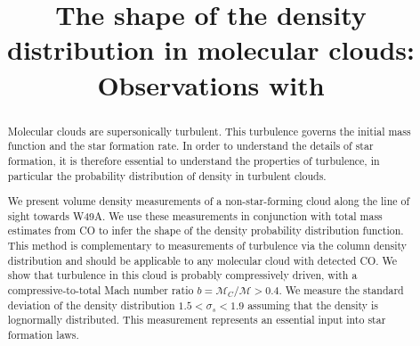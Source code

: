 \title{The shape of the density distribution in molecular clouds: Observations with
\formaldehyde}
\begin{abstract}
    Molecular clouds are supersonically turbulent.  This turbulence governs
    the initial mass function and the star formation rate.  In order to
    understand the details of star formation, it is therefore essential to understand
    the properties of turbulence, in particular the probability distribution of
    density in turbulent clouds.

    We present \formaldehyde volume density measurements of a non-star-forming
    cloud along the line of sight towards W49A. We use these measurements in
    conjunction with total mass estimates from CO to infer the shape of the
    density probability distribution function.  This method is complementary to
    measurements of turbulence via the column density distribution and should
    be applicable to any molecular cloud with detected CO.  We show that
    turbulence in this cloud is probably compressively driven, with a
    compressive-to-total Mach number ratio $b = \mathcal{M}_C/\mathcal{M}>0.4$.  
    We measure the standard deviation of the density distribution $1.5 < \sigma_s < 1.9$
    assuming that the density is lognormally distributed.  This measurement
    represents an essential input into star formation laws.



\end{abstract}
